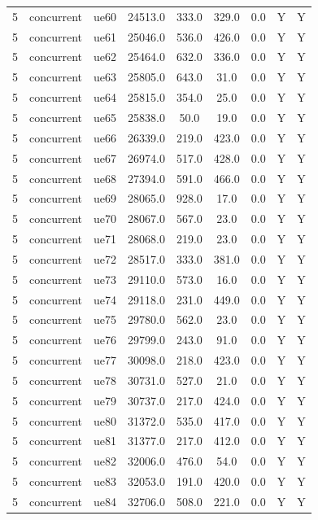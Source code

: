 \begin{table}[ht]
\begin{tabular}{|c|c|c|c|c|c|c|c|c|}
5 & concurrent & ue60 & 24513.0 & 333.0 & 329.0 & 0.0 & Y & Y \\
5 & concurrent & ue61 & 25046.0 & 536.0 & 426.0 & 0.0 & Y & Y \\
5 & concurrent & ue62 & 25464.0 & 632.0 & 336.0 & 0.0 & Y & Y \\
5 & concurrent & ue63 & 25805.0 & 643.0 & 31.0 & 0.0 & Y & Y \\
5 & concurrent & ue64 & 25815.0 & 354.0 & 25.0 & 0.0 & Y & Y \\
5 & concurrent & ue65 & 25838.0 & 50.0 & 19.0 & 0.0 & Y & Y \\
5 & concurrent & ue66 & 26339.0 & 219.0 & 423.0 & 0.0 & Y & Y \\
5 & concurrent & ue67 & 26974.0 & 517.0 & 428.0 & 0.0 & Y & Y \\
5 & concurrent & ue68 & 27394.0 & 591.0 & 466.0 & 0.0 & Y & Y \\
5 & concurrent & ue69 & 28065.0 & 928.0 & 17.0 & 0.0 & Y & Y \\
5 & concurrent & ue70 & 28067.0 & 567.0 & 23.0 & 0.0 & Y & Y \\
5 & concurrent & ue71 & 28068.0 & 219.0 & 23.0 & 0.0 & Y & Y \\
5 & concurrent & ue72 & 28517.0 & 333.0 & 381.0 & 0.0 & Y & Y \\
5 & concurrent & ue73 & 29110.0 & 573.0 & 16.0 & 0.0 & Y & Y \\
5 & concurrent & ue74 & 29118.0 & 231.0 & 449.0 & 0.0 & Y & Y \\
5 & concurrent & ue75 & 29780.0 & 562.0 & 23.0 & 0.0 & Y & Y \\
5 & concurrent & ue76 & 29799.0 & 243.0 & 91.0 & 0.0 & Y & Y \\
5 & concurrent & ue77 & 30098.0 & 218.0 & 423.0 & 0.0 & Y & Y \\
5 & concurrent & ue78 & 30731.0 & 527.0 & 21.0 & 0.0 & Y & Y \\
5 & concurrent & ue79 & 30737.0 & 217.0 & 424.0 & 0.0 & Y & Y \\
5 & concurrent & ue80 & 31372.0 & 535.0 & 417.0 & 0.0 & Y & Y \\
5 & concurrent & ue81 & 31377.0 & 217.0 & 412.0 & 0.0 & Y & Y \\
5 & concurrent & ue82 & 32006.0 & 476.0 & 54.0 & 0.0 & Y & Y \\
5 & concurrent & ue83 & 32053.0 & 191.0 & 420.0 & 0.0 & Y & Y \\
5 & concurrent & ue84 & 32706.0 & 508.0 & 221.0 & 0.0 & Y & Y \\

\end{tabular}
\end{table}
